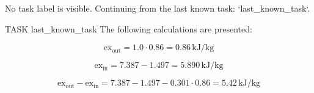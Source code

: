 No task label is visible. Continuing from the last known task: `{last_known_task}`.

TASK {last_known_task}
The following calculations are presented:

\[
\text{ex}_{\text{out}} = 1.0 \cdot 0.86 = 0.86 \, \text{kJ/kg}
\]

\[
\text{ex}_{\text{in}} = 7.387 - 1.497 = 5.890 \, \text{kJ/kg}
\]

\[
\text{ex}_{\text{out}} - \text{ex}_{\text{in}} = 7.387 - 1.497 - 0.301 \cdot 0.86 = 5.42 \, \text{kJ/kg}
\]